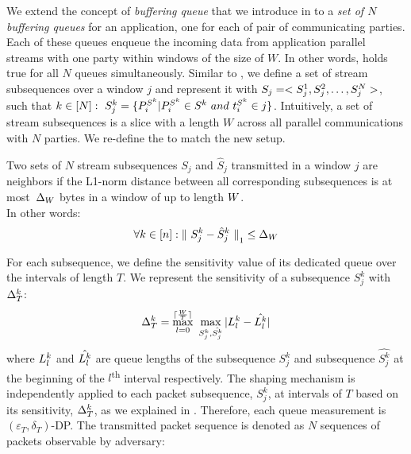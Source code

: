 We extend the concept of \textit{buffering queue} that we introduce in  to a \textit{set of $N$ buffering queues} for an application, one for each of pair of communicating parties.  
Each of these queues enqueue the incoming data from application parallel streams with one party within windows of the size of $W$. 
In other words,  holds true for all $N$ queues simultaneously. 
Similar to , we define a set of stream subsequences over a window $j$ and represent it with $S_j = <S^1_j, S^2_j, \dots, S^N_j>$, such that $k \in [N]:~S_j^k = \{P^{S^k}_i | P^{S^k}_i \in S^k~and~t_i^{S^k} \in j\}$. 
Intuitively, a set of stream subsequences is a slice with a length $W$ across all parallel communications with $N$ parties.
We re-define the  to match the new setup.
\begin{definition}\label{def:neighboring-series-stream}
  Two sets of $N$ stream subsequences $S_{j}$ and $\hat{S}_{j}$ transmitted in a window $j$ are neighbors if the L1-norm distance between all corresponding subsequences is at most~$\Delta_{W}$ bytes in a window of up to length $W$.
  \\
  In other words: 
  \begin{equation*}
    \forall k \in [n]: {\|~S_{j}^k - \hat{S}_{j}^k~\|}_1 \leq \Delta_{W}
  \end{equation*}
\end{definition}
\noindent
For each subsequence, we define the sensitivity value of its dedicated queue over the intervals of length $T$. 
We represent the sensitivity of a subsequence $S_{j}^k$ with $\Delta_T^k$: 
\begin{equation}
  \Delta_T^k = \max_{l = 0}^{\lceil \frac{W}{T} \rceil}~\max_{S_{j}^k,
      \hat{S_{j}^k}} | L_{l}^k - \hat{L_{l}^k} |
  \label{eqn:ssens-multi-stream}
\end{equation}
where $L_{l}^k$ and  $\hat{L_{l}^k}$ are queue lengths of the subsequence $S_{j}^k$ and subsequence $\hat{S_{j}^k}$ at the beginning of the $l$\textsuperscript{th} interval respectively.
The shaping mechanism is independently applied to each packet subsequence, $S_{j}^k$, at intervals of $T$ based on its sensitivity, $\Delta_T^k$, as we explained in .
Therefore, each queue measurement is $(\varepsilon_T, \delta_T)$-DP.
The transmitted packet sequence is denoted as $N$ sequences of packets observable by adversary:
